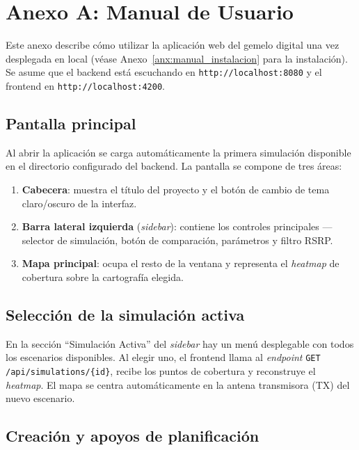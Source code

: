 
\chapter{Anexo A: Manual de Usuario}
\label{anx:manual_usuario}

Este anexo describe cómo utilizar la aplicación web del gemelo digital una vez
desplegada en local (véase Anexo~\ref{anx:manual_instalacion} para la instalación).
Se asume que el backend está escuchando en \texttt{http://localhost:8080} y el
frontend en \texttt{http://localhost:4200}.

\section{Pantalla principal}
\label{sec:manual_pantalla}

Al abrir la aplicación se carga automáticamente la primera simulación disponible
en el directorio configurado del backend. La pantalla se compone de tres áreas:

\begin{enumerate}
\item \textbf{Cabecera}: muestra el título del proyecto y el botón de cambio de
  tema claro/oscuro de la interfaz.
\item \textbf{Barra lateral izquierda} (\textit{sidebar}): contiene los controles
  principales --- selector de simulación, botón de comparación, parámetros y
  filtro RSRP.
\item \textbf{Mapa principal}: ocupa el resto de la ventana y representa el
  \textit{heatmap} de cobertura sobre la cartografía elegida.
\end{enumerate}

\section{Selección de la simulación activa}
\label{sec:manual_simulacion}

En la sección ``Simulación Activa'' del \textit{sidebar} hay un menú desplegable
con todos los escenarios disponibles. Al elegir uno, el frontend llama al
\textit{endpoint} \texttt{GET /api/simulations/\{id\}}, recibe los puntos de
cobertura y reconstruye el \textit{heatmap}. El mapa se centra automáticamente
en la antena transmisora (TX) del nuevo escenario.

\section{Creación y apoyos de planificación}


